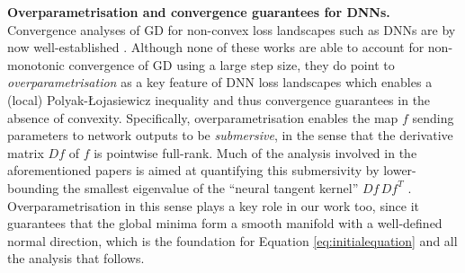 \documentclass{article}
\newcommand{\myparagraph}[1]{\noindent\textbf{#1.}}
\theoremstyle{plain}
\theoremstyle{definition}
\theoremstyle{remark}
\begin{document}
\myparagraph{Overparametrisation and convergence guarantees for DNNs} Convergence analyses of GD for non-convex loss landscapes such as DNNs are by now well-established \cite{du1, du2, zhu, nguyen1, nguyen2, nguyen3, bombari}. Although none of these works are able to account for non-monotonic convergence of GD using a large step size, they do point to \emph{overparametrisation} as a key feature of DNN loss landscapes which enables a (local) Polyak-Łojasiewicz inequality and thus convergence guarantees in the absence of convexity. Specifically, overparametrisation enables the map $f$ sending parameters to network outputs to be \emph{submersive}, in the sense that the derivative matrix $Df$ of $f$ is pointwise full-rank. Much of the analysis involved in the aforementioned papers is aimed at  quantifying this submersivity by lower-bounding the smallest eigenvalue of the ``neural tangent kernel'' $Df\,Df^T$ \cite{jacot, bombari}. Overparametrisation in this sense plays a key role in our work too, since it guarantees that the global minima form a smooth manifold with a well-defined normal direction, which is the foundation for Equation \eqref{eq:initialequation} and all the analysis that follows.
\end{document}
